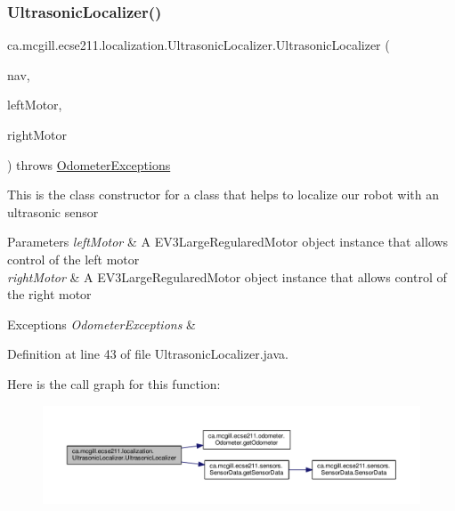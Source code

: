 \subsubsection{\texorpdfstring{Ultrasonic\+Localizer()}{UltrasonicLocalizer()}}
{\footnotesize\ttfamily ca.\+mcgill.\+ecse211.\+localization.\+Ultrasonic\+Localizer.\+Ultrasonic\+Localizer (\begin{DoxyParamCaption}\item[{\hyperlink{classca_1_1mcgill_1_1ecse211_1_1project_1_1_navigation}{Navigation}}]{nav,  }\item[{E\+V3\+Large\+Regulated\+Motor}]{left\+Motor,  }\item[{E\+V3\+Large\+Regulated\+Motor}]{right\+Motor }\end{DoxyParamCaption}) throws \hyperlink{classca_1_1mcgill_1_1ecse211_1_1odometer_1_1_odometer_exceptions}{Odometer\+Exceptions}}

This is the class constructor for a class that helps to localize our robot with an ultrasonic sensor


\begin{DoxyParams}{Parameters}
{\em left\+Motor} & A E\+V3\+Large\+Regulared\+Motor object instance that allows control of the left motor \\
\hline
{\em right\+Motor} & A E\+V3\+Large\+Regulared\+Motor object instance that allows control of the right motor \\
\hline
\end{DoxyParams}

\begin{DoxyExceptions}{Exceptions}
{\em Odometer\+Exceptions} & \\
\hline
\end{DoxyExceptions}


Definition at line 43 of file Ultrasonic\+Localizer.\+java.

Here is the call graph for this function\+:
\nopagebreak
\begin{figure}[H]
\begin{center}
\leavevmode
\includegraphics[width=350pt]{classca_1_1mcgill_1_1ecse211_1_1localization_1_1_ultrasonic_localizer_a3603202cdb5035c4e4164933b0aebeec_cgraph}
\end{center}
\end{figure}


